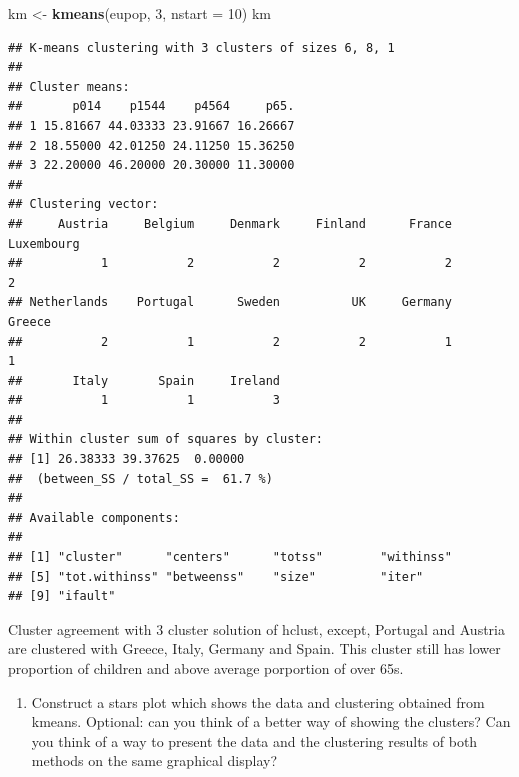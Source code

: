 \documentclass[]{article}
\newenvironment{Shaded}{\begin{snugshade}}{\end{snugshade}}
\newcommand{\DataTypeTok}[1]{\textcolor[rgb]{0.13,0.29,0.53}{#1}}
\newcommand{\DecValTok}[1]{\textcolor[rgb]{0.00,0.00,0.81}{#1}}
\newcommand{\KeywordTok}[1]{\textcolor[rgb]{0.13,0.29,0.53}{\textbf{#1}}}
\newcommand{\NormalTok}[1]{#1}
\newcommand{\OperatorTok}[1]{\textcolor[rgb]{0.81,0.36,0.00}{\textbf{#1}}}
\newcommand{\StringTok}[1]{\textcolor[rgb]{0.31,0.60,0.02}{#1}}
\providecommand{\tightlist}{%
  \setlength{\itemsep}{0pt}\setlength{\parskip}{0pt}}
\begin{document}
\begin{Shaded}
\begin{Highlighting}[]
\NormalTok{km <-}\StringTok{ }\KeywordTok{kmeans}\NormalTok{(eupop, }\DecValTok{3}\NormalTok{, }\DataTypeTok{nstart =} \DecValTok{10}\NormalTok{)}
\NormalTok{km}
\end{Highlighting}
\end{Shaded}

\begin{verbatim}
## K-means clustering with 3 clusters of sizes 6, 8, 1
## 
## Cluster means:
##       p014    p1544    p4564     p65.
## 1 15.81667 44.03333 23.91667 16.26667
## 2 18.55000 42.01250 24.11250 15.36250
## 3 22.20000 46.20000 20.30000 11.30000
## 
## Clustering vector:
##     Austria     Belgium     Denmark     Finland      France  Luxembourg 
##           1           2           2           2           2           2 
## Netherlands    Portugal      Sweden          UK     Germany      Greece 
##           2           1           2           2           1           1 
##       Italy       Spain     Ireland 
##           1           1           3 
## 
## Within cluster sum of squares by cluster:
## [1] 26.38333 39.37625  0.00000
##  (between_SS / total_SS =  61.7 %)
## 
## Available components:
## 
## [1] "cluster"      "centers"      "totss"        "withinss"    
## [5] "tot.withinss" "betweenss"    "size"         "iter"        
## [9] "ifault"
\end{verbatim}

Cluster agreement with 3 cluster solution of hclust, except, Portugal
and Austria are clustered with Greece, Italy, Germany and Spain. This
cluster still has lower proportion of children and above average
porportion of over 65s.

\begin{enumerate}
\def\labelenumi{\alph{enumi})}
\setcounter{enumi}{3}
\tightlist
\item
  Construct a stars plot which shows the data and clustering obtained
  from kmeans. Optional: can you think of a better way of showing the
  clusters? Can you think of a way to present the data and the
  clustering results of both methods on the same graphical display?
\end{enumerate}

\begin{Shaded}
\end{Shaded}
\end{document}
